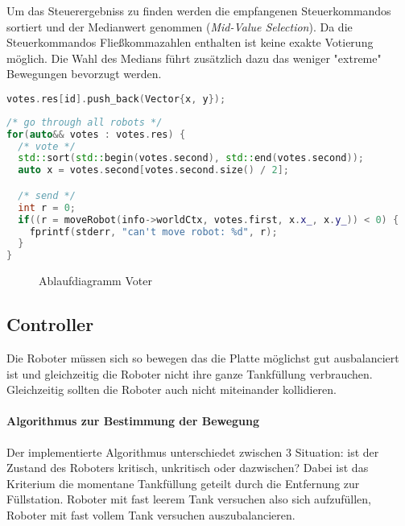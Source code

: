 {Um das Steuerergebniss zu finden werden die empfangenen Steuerkommandos sortiert und der Medianwert genommen (\textit{Mid-Value Selection}). Da die Steuerkommandos
Flie{\ss}kommazahlen enthalten ist keine exakte Votierung m{\"{o}}glich. Die Wahl des Medians f{\"{u}}hrt zus{\"{a}}tzlich dazu das weniger "extreme" Bewegungen bevorzugt werden.
\noindent\begin{minipage}{.30\textwidth}
\begin{lstlisting}[caption=Sammeln, frame=tlrb, language=c++]
votes.res[id].push_back(Vector{x, y});
\end{lstlisting}
\end{minipage}\hfill
\begin{minipage}{.60\textwidth}
\begin{lstlisting}[caption=Auswahl, frame=tlrb, language=c++]
/* go through all robots */
for(auto&& votes : votes.res) {
  /* vote */
  std::sort(std::begin(votes.second), std::end(votes.second));
  auto x = votes.second[votes.second.size() / 2];

  /* send */
  int r = 0;
  if((r = moveRobot(info->worldCtx, votes.first, x.x_, x.y_)) < 0) {
  	fprintf(stderr, "can't move robot: %d", r);
  }
}
\end{lstlisting}
\end{minipage}


\begin{figure}
	\centering
	\caption{Ablaufdiagramm Voter}
	\label{fig:sequence-voter}
\end{figure}
\clearpage %

\subsection{Controller}\label{controller}
Die Roboter m{\"{u}}ssen sich so bewegen das die Platte m{\"{o}}glichst gut ausbalanciert
ist und gleichzeitig die Roboter nicht ihre ganze Tankf{\"{u}}llung verbrauchen. Gleichzeitig sollten die Roboter auch nicht miteinander
kollidieren.

\paragraph{Algorithmus zur Bestimmung der Bewegung} Der implementierte Algorithmus unterschiedet zwischen 3 Situation: ist der Zustand des Roboters kritisch,
unkritisch oder dazwischen? Dabei ist das Kriterium die momentane Tankf{\"{u}}llung geteilt durch die Entfernung zur F{\"{u}}llstation. Roboter mit fast leerem Tank
versuchen also sich aufzuf{\"{u}}llen, Roboter mit fast vollem Tank versuchen auszubalancieren.

}
